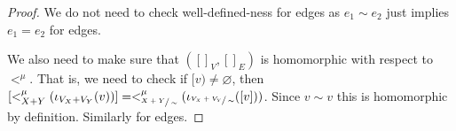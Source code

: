 \begin{proof}
    We do not need to check well-defined-ness for edges as $e_1 \sim e_2$ just implies $e_1 = e_2$ for edges.

    We also need to make sure that $([]_{V},[]_{E})$ is homomorphic with respect to $<^{\mu}$.
    That is, we need to check if $[v) \not = \varnothing$, then $[<_{X+Y}^{\mu}(\iota_{V_{X} + V_{Y}}(v))] = <_{\sfrac{X+Y}{\sim}}^{\mu}(\iota_{\sfrac{V_{X} + V_{Y}}{\sim}}([v]))$.
    Since $v \sim v$ this is homomorphic by definition.
    Similarly for edges.
    

\end{proof}
